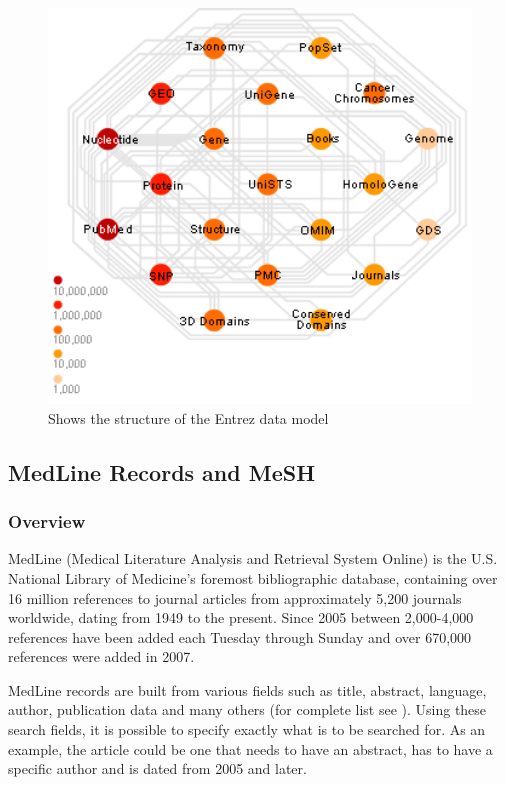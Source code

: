 \begin{figure}[H]
        \begin{center}
          \includegraphics[width=1.0\textwidth]{drawings/entrez_datamodel.png}
        \end{center}
        \caption{Shows the structure of the Entrez data model}
        \label{EntrezDatamodel}
\end{figure}

\subsection{MedLine Records and MeSH\label{MedLine_records_MeSH}}

\subsubsection{Overview}
MedLine (Medical Literature Analysis and Retrieval System Online)
\cite{PubMedFactSheetMedline} is the U.S. National Library of
Medicine's foremost bibliographic database, containing over 16 million
references to journal articles from approximately 5,200 journals
worldwide, dating from 1949 to the present. Since 2005 between
2,000-4,000 references have been added each Tuesday through Sunday and
over 670,000 references were added in 2007.

MedLine records are built from various fields such as title, abstract,
language, author, publication data and many others (for complete list
see \cite{PubMedHelpSearchFieldDescriptionsTags}). Using these search
fields, it is possible to specify exactly what is to be searched
for. As an example, the article could be one that needs to have an
abstract, has to have a specific author and is dated from 2005 and
later.

